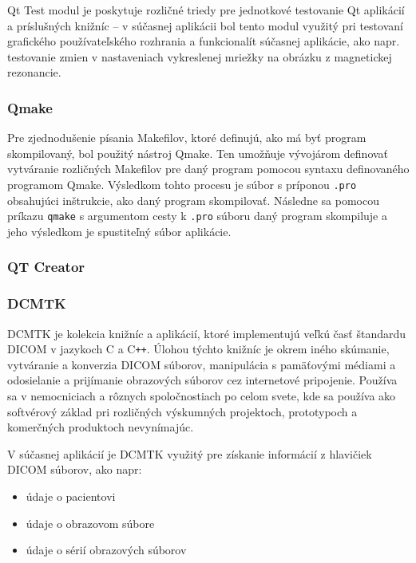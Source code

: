 Qt Test modul je poskytuje rozličné triedy pre jednotkové testovanie Qt aplikácií a príslušných knižníc -- v súčasnej aplikácii bol tento modul využitý pri testovaní grafického používateľského rozhrania a funkcionalít súčasnej aplikácie, ako napr. testovanie zmien v nastaveniach vykreslenej mriežky na obrázku z magnetickej rezonancie.


\subsubsection {Qmake}

Pre zjednodušenie písania Makefilov, ktoré definujú, ako má byť program skompilovaný, bol použitý nástroj Qmake. Ten umožňuje vývojárom definovať vytváranie rozličných Makefilov pre daný program pomocou syntaxu definovaného programom Qmake. Výsledkom tohto procesu je súbor s príponou \lstinline{.pro} obsahujúci inštrukcie, ako daný program skompilovať. Následne sa pomocou príkazu \lstinline{qmake} s argumentom cesty k \lstinline{.pro} súboru daný program skompiluje a jeho výsledkom je spustiteľný súbor aplikácie.

\subsubsection {QT Creator}


\subsubsection {DCMTK}

DCMTK je kolekcia knižníc a aplikácií, ktoré implementujú veľkú časť štandardu DICOM v jazykoch C a C\texttt{++}. Úlohou týchto knižníc je okrem iného skúmanie, vytváranie a konverzia DICOM súborov, manipulácia s pamäťovými médiami a odosielanie a prijímanie obrazových súborov cez internetové pripojenie. Používa sa v nemocniciach a rôznych spoločnostiach po celom svete, kde sa používa ako softvérový základ pri rozličných výskumných projektoch, prototypoch a komerčných produktoch nevynímajúc. \newline

V súčasnej aplikácií je DCMTK využitý pre získanie informácií z hlavičiek DICOM súborov, ako napr:

\begin{itemize}
\item {údaje o pacientovi}
\item {údaje o obrazovom súbore}
\item {údaje o sérií obrazových súborov}
\end{itemize}

